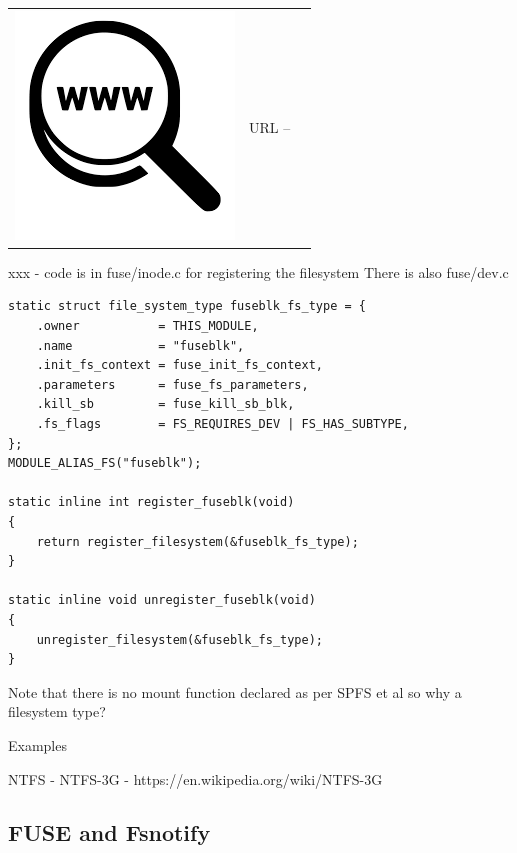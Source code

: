 \begin{table}[h]
\begin{tabular}{lcl}
\parbox[r]{0.5in}{\includegraphics[scale=0.15]{figures/url.png}} & \parbox[l]{0.55in}{URL  -- } & \parbox[l]{3in}{}
\end{tabular}
\end{table}

\noindent
xxx - code is in fuse/inode.c for registering the filesystem There is also fuse/dev.c

\begin{lstlisting}
static struct file_system_type fuseblk_fs_type = {
    .owner           = THIS_MODULE,
    .name            = "fuseblk",
    .init_fs_context = fuse_init_fs_context,
    .parameters      = fuse_fs_parameters,
    .kill_sb         = fuse_kill_sb_blk,
    .fs_flags        = FS_REQUIRES_DEV | FS_HAS_SUBTYPE,
};  
MODULE_ALIAS_FS("fuseblk");

static inline int register_fuseblk(void)
{
    return register_filesystem(&fuseblk_fs_type);
}   
    
static inline void unregister_fuseblk(void)
{   
    unregister_filesystem(&fuseblk_fs_type);
} 
\end{lstlisting}

\noindent
Note that there is no mount function declared as per SPFS et al so why a filesystem type?

Examples

NTFS - %
NTFS-3G - https://en.wikipedia.org/wiki/NTFS-3G


\subsection{FUSE and Fsnotify}

